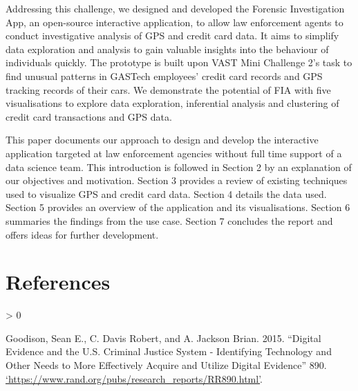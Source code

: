 \documentclass{acm_proc_article-sp}
\newlength{\cslhangindent}
\newenvironment{CSLReferences}[2] %
 {%
  \setlength{\parindent}{0pt}
  \ifodd #1 \everypar{\setlength{\hangindent}{\cslhangindent}}\ignorespaces\fi
  \ifnum #2 > 0
  \setlength{\parskip}{#2\baselineskip}
  \fi
 }%
 {}
\begin{document}
Addressing this challenge, we designed and developed the Forensic
Investigation App, an open-source interactive application, to allow law
enforcement agents to conduct investigative analysis of GPS and credit
card data. It aims to simplify data exploration and analysis to gain
valuable insights into the behaviour of individuals quickly. The
prototype is built upon VAST Mini Challenge 2's task to find unusual
patterns in GASTech employees' credit card records and GPS tracking
records of their cars. We demonstrate the potential of FIA with five
visualisations to explore data exploration, inferential analysis and
clustering of credit card transactions and GPS data.

This paper documents our approach to design and develop the interactive
application targeted at law enforcement agencies without full time
support of a data science team. This introduction is followed in Section
2 by an explanation of our objectives and motivation. Section 3 provides
a review of existing techniques used to visualize GPS and credit card
data. Section 4 details the data used. Section 5 provides an overview of
the application and its visualisations. Section 6 summaries the findings
from the use case. Section 7 concludes the report and offers ideas for
further development.

\hypertarget{references}{%
\section*{References}\label{references}}

\hypertarget{refs}{}
\begin{CSLReferences}{1}{0}
\leavevmode\hypertarget{ref-goodison2015}{}%
Goodison, Sean E., C. Davis Robert, and A. Jackson Brian. 2015.
{``Digital Evidence and the U.S. Criminal Justice System - Identifying
Technology and Other Needs to More Effectively Acquire and Utilize
Digital Evidence''} 890.
\url{‘https://www.rand.org/pubs/research_reports/RR890.html’}.

\end{CSLReferences}
\setlength{\parindent}{0in}
\end{document}
